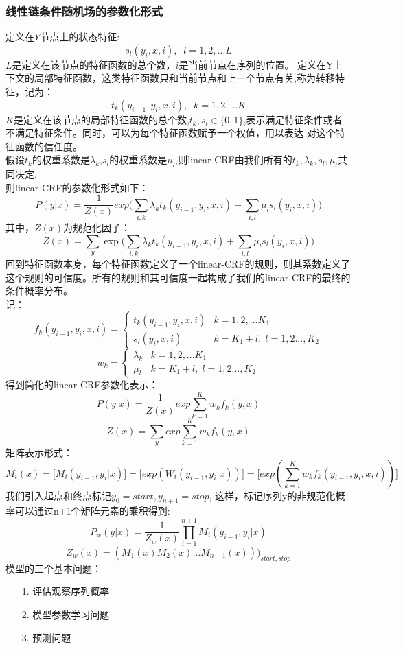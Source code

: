 \documentclass[UTF8]{article}%
\begin{document}
	\subsubsection{线性链条件随机场的参数化形式}
	定义在$Y$节点上的状态特征:
	$$s_l(y_i, x,i),\;\; l =1,2,...L$$
	$L$是定义在该节点的特征函数的总个数，$i$是当前节点在序列的位置。
	定义在Y上下文的局部特征函数，这类特征函数只和当前节点和上一个节点有关,称为转移特征，记为：
	$$t_k(y_{i-1},y_i, x,i),\;\; k =1,2,...K$$
	$K$是定义在该节点的局部特征函数的总个数,$t_k,s_l\in\{0,1\}$,表示满足特征条件或者不满足特征条件。同时，可以为每个特征函数赋予一个权值，用以表达 对这个特征函数的信任度。\\
	假设$t_k$的权重系数是$\lambda_k$,$s_l$的权重系数是$\mu_l$,则linear-CRF由我们所有的$t_k,\lambda_k,s_l,\mu_l$共同决定.\\
	则linear-CRF的参数化形式如下：
	$$P(y|x) = \frac{1}{Z(x)}exp\Big(\sum\limits_{i,k} \lambda_kt_k(y_{i-1},y_i, x,i) +\sum\limits_{i,l}\mu_ls_l(y_i, x,i)\Big)$$
	其中，$Z(x)$为规范化因子：
	$$ Z(x) =\sum\limits_{y} \exp\Big(\sum\limits_{i,k} \lambda_kt_k(y_{i-1},y_i, x,i) +\sum\limits_{i,l}\mu_ls_l(y_i, x,i)\Big)$$
	回到特征函数本身，每个特征函数定义了一个linear-CRF的规则，则其系数定义了这个规则的可信度。所有的规则和其可信度一起构成了我们的linear-CRF的最终的条件概率分布。
	\\记：\\
	$$f_k(y_{i-1},y_i, x,i)= \begin{cases} t_k(y_{i-1},y_i, x,i) & {k=1,2,...K_1}\\ s_l(y_i, x,i)& {k=K_1+l,\; l=1,2...,K_2} \end{cases}$$
	$$w_k= \begin{cases} \lambda_k & {k=1,2,...K_1}\\ \mu_l & {k=K_1+l,\; l=1,2...,K_2} \end{cases}$$
	得到简化的linear-CRF参数化表示：
	$$P(y|x) =  \frac{1}{Z(x)}exp\sum\limits_{k=1}^Kw_kf_k(y,x)$$
	$$Z(x) =\sum\limits_{y}exp\sum\limits_{k=1}^Kw_kf_k(y,x)$$
	矩阵表示形式：
	$$M_i(x) = \Big[ M_i(y_{i-1},y_i |x)\Big] =  \Big[  exp(W_i(y_{i-1},y_i |x))\Big] = \Big[  exp(\sum\limits_{k=1}^Kw_kf_k(y_{i-1},y_i, x,i))\Big]$$
	我们引入起点和终点标记$y_0 =start, y_{n+1} = stop$, 这样，标记序列y的非规范化概率可以通过n+1个矩阵元素的乘积得到:
	$$P_w(y|x) =  \frac{1}{Z_w(x)}\prod_{i=1}^{n+1}M_i(y_{i-1},y_i |x)$$
	$$Z_w(x)=(M_1(x)M_2(x)...M_{n+1}(x)))_{start,stop}$$
	\newpage
	\flushleft
	模型的三个基本问题：
	\begin{enumerate}		
		\item[1.]评估观察序列概率
		\item[2.]模型参数学习问题
		\item[3.]预测问题
	\end{enumerate}
\end{document}
